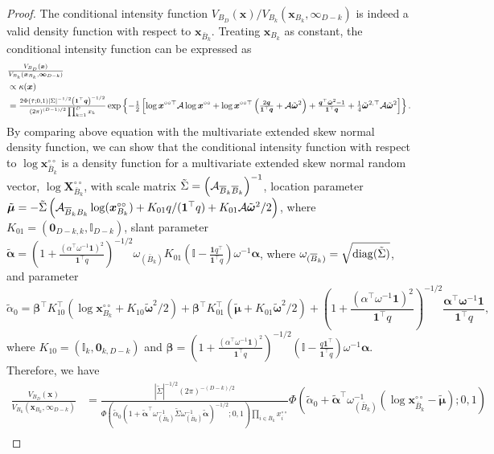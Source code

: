 \documentclass[lineno]{biometrika}
\begin{document}
\begin{proof}
The conditional intensity function $V_{B_D}(\bm x)/V_{B_k}(\bm x_{B_k},\bm \infty_{D-k})$ is indeed a valid density function \citep{Wadsworth.Tawn:2013} with respect to $\bm x_{\bar B_k}$. Treating $\bm x_{B_k}$ as constant, the conditional intensity function can be expressed as 
\begin{align*}
    & {\textstyle{V_{B_D}(\bm x)\over V_{B_k}(\bm x_{B_k},\bm \infty_{D-k})}} \\
    & \propto \kappa(\bm x) \\
    & = {\textstyle{2\Phi(\tilde{\tau};0,1)| \Sigma |^{-1/2} \left( \bm 1^\top \bm q\right)^{-1/2}\over\left( 2\pi \right)^{(D-1)/2}\prod_{k=1}^Dx_k}}\exp \left\{ -{\textstyle{1\over2}} \left[ \log \bm x^{\circ\circ\top} \mathcal{A} \log \bm x^{\circ\circ} + \log \bm x^{\circ\circ\top} \left( {\textstyle{2 \bm q\over\bm 1^\top \bm q}}+{\mathcal A}\tilde{\bm\omega}^2\right) + {\textstyle{\bm q^\top\tilde{\bm \omega}^2 - 1\over\bm 1 ^\top \bm q }} + {\textstyle{1\over4}}\tilde{\bm\omega}^{2,\top}{\mathcal A}\tilde{\bm\omega}^2 \right]\right\}.
\end{align*}    
 By comparing above equation with the multivariate extended skew normal density function, we can show that the conditional intensity function with respect to $\log\bm x_{\bar B_k}^{\circ\circ}$ is a density function for a multivariate  extended skew normal random vector, $\log\bm X_{\bar B_k}^{\circ\circ}$, with scale matrix $\tilde\Sigma = \left({\mathcal A}_{{\overline{B}}_k{\overline{B}}_k}\right)^{-1}$, location parameter $\tilde{\bm\mu} = -\tilde\Sigma\left({\mathcal A}_{{\overline{B}}_kB_k}\log(\bm x_{B_k}^{\circ\circ}) + K_{01}q/(\bm 1^\top q)+K_{01}{\mathcal A}\tilde{\bm\omega}^2/2\right)$, where $K_{01} = (\bm 0_{D-k,k},\mathbb I_{D-k})$, slant parameter $\tilde{\bm\alpha}=\left(1 + \frac{\left(\alpha^\top\omega^{-1}\bm 1\right)^2}{\bm 1^\top q}\right)^{-1/2}\omega_{(\bar B_k)} K_{01}\left(\mathbb{I} - \frac{\bm 1 q^\top}{\bm 1^\top q}\right)\omega^{-1}\bm\alpha$, where $\omega_{({\overline{B}}_k)}=\sqrt{{\rm diag}(\tilde\Sigma)}$, and parameter 
$$\tilde\alpha_0 = \bm\beta^\top K_{10}^\top(\log \bm x_{B_k}^{\circ\circ}+K_{10}\tilde{\bm\omega}^2/2) + \bm\beta^\top K_{01}^\top(\tilde{\bm\mu} + K_{01}\tilde{\bm\omega}^2/2) +  \left(1 + \frac{(\alpha^\top\omega^{-1}\bm 1)^2}{\bm 1^\top q}\right)^{-1/2}\frac{\bm\alpha^\top\bm\omega^{-1}\bm 1}{\bm 1^\top q},$$ 
where $K_{10} = (\mathbb I_{k},\bm 0_{k,D-k})$ and
$\bm\beta = \left(1 + \frac{(\alpha^\top\omega^{-1}\bm 1)^2}{\bm 1^\top q}\right)^{-1/2}\left(\mathbb I - \frac{q\bm 1^\top}{\bm 1^\top q}\right)\omega^{-1}\bm\alpha.$
Therefore, we have
\begin{align*}
\frac{V_{B_D}(\bm x)}{V_{B_k}(\bm x_{B_k},\bm \infty_{D-k})} &= \frac{|\tilde\Sigma|^{-1/2}(2\pi)^{-(D-k)/2}}{\Phi\left(\tilde\alpha_0\left(1+\tilde{\bm\alpha}^\top\omega_{(\bar B_k)}^{-1}\tilde\Sigma\omega_{(\bar B_k)}^{-1}\tilde{\bm\alpha}\right)^{-1/2};0,1\right) \prod_{i\in\bar B_k}x_i^{\circ\circ}} \Phi\left(\tilde\alpha_0 + \tilde{\bm\alpha}^\top\omega_{(\bar B_k)}^{-1}\left(\log \bm x_{\bar B_k}^{\circ\circ} - \tilde{\bm\mu}\right);0,1\right) \\

\end{align*}
\end{proof}
\end{document}
